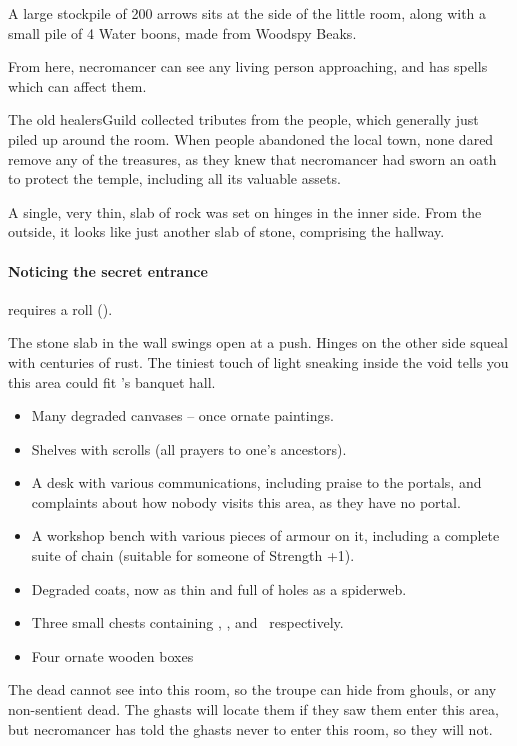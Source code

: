 A large stockpile of 200 arrows sits at the side of the little room, along with a small pile of 4 Water \glspl{boon}, made from Woodspy Beaks.

From here, \gls{necromancer} can see any living person approaching, and has spells which can affect them.

\thenecromancer

\showStdSpells[
  \deathStormSpell
]


\begin{exampletext}
  The old \gls{healersGuild} collected tributes from the people, which generally just piled up around the room.
  When people abandoned the local town, none dared remove any of the treasures, as they knew that \gls{necromancer} had sworn an oath to protect the temple, including all its valuable assets.
\end{exampletext}

\noindent
A single, very thin, slab of rock was set on hinges in the inner side.
From the outside, it looks like just another slab of stone, comprising the hallway.

\paragraph{Noticing the secret entrance}
requires a  roll (\tn[12]).

\begin{boxtext}
  The stone slab in the wall swings open at a push.
  Hinges on the other side squeal with centuries of rust.
  The tiniest touch of light sneaking inside the void tells you this area could fit 's banquet hall.
\end{boxtext}

\begin{itemize}
  \item
  Many degraded canvases -- once ornate paintings.
  \item
  Shelves with scrolls (all prayers to one's ancestors).
  \item
  A desk with various communications, including praise to the portals, and complaints about how nobody visits this area, as they have no portal.
  \item
  A workshop bench with various pieces of armour on it, including a complete suite of chain (suitable for someone of Strength +1).
  \item
  Degraded coats, now as thin and full of holes as a spiderweb.
  \item
  Three small chests containing \lootMedium, \lootBig, and \lootBig\ respectively.
  \item
  Four ornate wooden boxes%
\end{itemize}

The dead cannot see into this room, so the troupe can hide from ghouls, or any non-sentient dead.
The ghasts will locate them if they saw them enter this area, but \gls{necromancer} has told the ghasts never to enter this room, so they will not.
